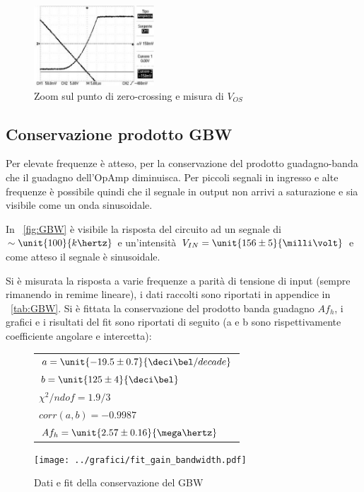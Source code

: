 \documentclass[10pt,a4paper]{article}
\begin{document}
\begin{figure}[H]
	\centering
	\includegraphics[width=0.4\textwidth]{../oscilloscopio/Vos.jpg}
	\caption{Zoom sul punto di zero-crossing e misura di $V_{OS}$}
	\label{fig:vos}
\end{figure}

\subsection{Conservazione prodotto GBW}
Per elevate frequenze è atteso, per la conservazione del prodotto guadagno-banda che il guadagno dell'OpAmp diminuisca. Per piccoli segnali in ingresso e alte frequenze è possibile quindi che il segnale in output non arrivi a saturazione e sia visibile come un onda sinusoidale.

In \figurename{~\ref{fig:GBW}} è visibile la risposta del circuito ad un segnale di $\sim\unit{100}{k\hertz}$ e un'intensità $V_{IN}= \unit{156 \pm 5}{\milli\volt}$ e come atteso il segnale è sinusoidale.

Si è misurata la risposta a varie frequenze a parità di tensione di input (sempre rimanendo in remime lineare), i dati raccolti sono riportati in appendice in \tablename{~\ref{tab:GBW}}. Si è fittata la conservazione del prodotto banda guadagno $Af_h$, i grafici e i risultati del fit sono riportati di seguito (a e b sono rispettivamente coefficiente angolare e intercetta):

\begin{figure}[H]
	\begin{minipage}{0.28\textwidth}
		\centering
		\begin{tabular}{l}
			$a = \unit{-19.5 \pm 0.7}{\deci\bel / decade}$ \\
			$b = \unit{125 \pm 4}{\deci \bel}$ \\
			$\chi^2 / ndof = 1.9/3$\\
			$corr(a,b) = -0.9987$\\
			$Af_h = \unit{2.57 \pm 0.16}{\mega\hertz}$
		\end{tabular}
	\end{minipage}
	\begin{minipage}{0.75\textwidth}
		\centering
		\texttt{[image: ../grafici/fit\_gain\_bandwidth.pdf]}
		\caption{Dati e fit della conservazione del GBW}
		\label{}
	\end{minipage}
\end{figure}
\end{document}
